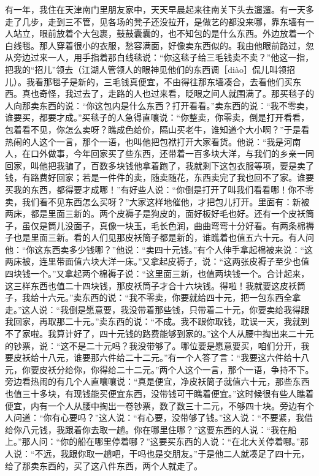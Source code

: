 \documentclass[12pt,UTF8]{ctexbook}
\begin{document}
有一年，我住在天津南门里朋友家中，天天早晨起来往南关下头去遛遛。有一天多走了几步，走到三不管，见各场的凳子还没拉开，是做艺的都没来哪，靠东墙有一人站立，眼前放着个大包裹，鼓鼓囊囊的，也不知包的是什么东西。外边放着一个白线毯。那人穿着很小的衣服，愁容满面，好像卖东西似的。我由他眼前路过，忽从旁边过来一人，用手指着那白线毯说：“你这毯子给三毛钱卖不卖？”他这一指，把我的“招儿”领去（江湖人管领人的眼神见他们的东西调［diào］侃儿叫领招儿）。我看那毯子是新的，三毛钱真便宜，不由得往那东墙凑合，去看他们买东西。真也奇怪，我过去了，走路的人也过来看，眨眼之间人就围满了。那买毯子的人向那卖东西的说：“你这包内是什么东西？打开看看。”卖东西的说：“我不零卖，谁要买，都要才成。”买毯子的人急得直嚷说：“你整卖，你零卖，倒是打开看看，包着看不见，你怎么卖呀？瞧成色给价，隔山买老牛，谁知道个大小啊？”于是看热闹的人这个一言，那个一语，也叫他把包袱打开大家看货。他说：“我是河南人，在口外做事，今年回家买了些东西，还带着一百多块大洋，与我们的乡亲一同回家，叫他把我骗了，百数多块钱他拿着跑了，我就剩下这包衣服等项，要是卖了钱，有路费好回家；若是一件件的卖，随卖随花，东西卖完了我也回不了家。谁要买我的东西，都得要才成哪！”有好些人说：“你倒是打开了叫我们看看哪！你不零卖，我们看不见东西怎么买呀？”大家这样地催他，才把包儿打开。里面有：新被两床，都是里面三新的。两个皮褥子是狗皮的，面好板好毛也好。还有一个皮袄筒子，虽仅是筒儿没面子，真像一块玉，毛长色润，曲曲弯弯十分好看。有两条棉褥子也是里面三新。看的人们见那皮袄筒子都是新的，谁瞧着也值五六十元。有人问他：“你这东西卖多少钱哪？”他说：“卖四十元钱。”有个人伸手拿起棉被来说：“这两床被，连里带面值六块大洋一床。”又拿起皮褥子，说：“这两张皮褥子至少也值四块钱一个。”又拿起两个棉褥子说：“这里面三新，也值两块钱一个。合计起来，这三样东西也值二十四块钱，那皮袄筒子才合十六块钱。得啦！我就要这皮袄筒子，我给十六元。”卖东西的说：“我不零卖，你要就给四十元，把一包东西全拿走。”这人说：“我倒是愿意要，我没带着那些钱，只带着二十元，你要卖给我得跟我回家，再取那二十元。”卖东西的说：“不成。我不跟你取钱，耽误一天，我就到不了家啦。我算计好了，四十元钱的路费能够到家的。”这个人从腰中掏出来二十元的钞票，说：“这不是二十元吗？我没带够了。哪位要是愿意要买，咱们分开，我要皮袄给十八元，谁要那六件给二十二元。”有一个人答了言：“我要这六件给十八元，你要皮袄分给你，你得给二十二元。”两个人这个一言，那个一语，争持不下。旁边看热闹的有几个人直嚷嚷说：“真是便宜，净皮袄筒子就值六十元，那些东西也值三十多块，有现钱能买便宜东西，没带钱可干瞧着便宜。”这时候很有些人瞧着便宜，内有一个人从腰中掏出一卷钞票，数了数三十二元，不够四十块。旁边有个人问道：“你有心要吗？”这人说：“有心要，没带够了钱。”这人说：“不要紧，我借给你八元钱，我跟着你去取一趟。你在哪里住哪？”这要东西的人说：“我在船上。”那人问：“你的船在哪里停着哪？”这要买东西的人说：“在北大关停着哪。”那人说：“不远，我跟你取一趟吧，干吗也是交朋友。”于是他二人就凑足了四十元，给了那卖东西的，买了这八件东西，两个人就走了。
\end{document}
